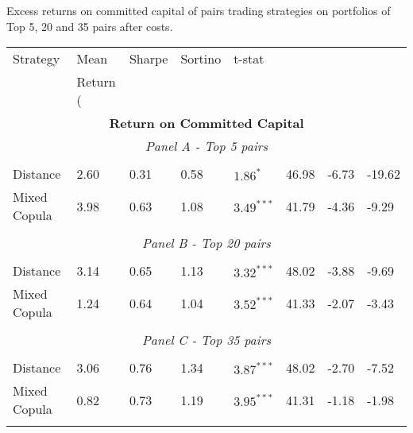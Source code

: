 \documentclass[a4paper]{article}
\begin{document}
	\begin{threeparttable}[H]
			\centering \tiny
			\caption{Excess returns on committed capital of pairs trading strategies on portfolios of Top 5, 20 and 35 pairs after costs. }
			\begin{tabularx}{\textwidth}{@{\extracolsep{\fill}}llllllll@{}}
				\toprule
				Strategy & Mean  & Sharpe & Sortino & t-stat & \\%
				& Return (\\%
				\midrule
				\multicolumn{8}{c}{\textbf{Return on Committed Capital}} \\
				\multicolumn{8}{c}{\textit{Panel A - Top 5 pairs}} \\
				&       &       &       &       &       &       &  \\
				Distance & 2.60  & 0.31  & 0.58  & $1.86^{*}$  & 46.98 & -6.73    & -19.62 \\
				Mixed Copula &  3.98  &  0.63  & 1.08  &  $3.49^{***}$  &  41.79 &  -4.36  &  -9.29 \\
				\multicolumn{1}{r}{} & \multicolumn{1}{r}{} & \multicolumn{1}{r}{} & \multicolumn{1}{r}{} & \multicolumn{1}{r}{} & \multicolumn{1}{r}{} & \multicolumn{1}{r}{} & \multicolumn{1}{r}{} \\
				\multicolumn{8}{c}{\textit{Panel B - Top 20 pairs}} \\
				&       &       &       &       &       &       &  \\
				Distance &  3.14  &  0.65  & 1.13  & $3.32^{***}$  & 48.02 & -3.88  & -9.69 \\
				Mixed Copula  & 1.24  & 0.64  & 1.04  & $3.52^{***}$  & 41.33 &  -2.07  &  -3.43  \\
				\multicolumn{1}{r}{} & \multicolumn{1}{r}{} & \multicolumn{1}{r}{} & \multicolumn{1}{r}{} & \multicolumn{1}{r}{} & \multicolumn{1}{r}{} & \multicolumn{1}{r}{} & \multicolumn{1}{r}{} \\
				\multicolumn{8}{c}{\textit{Panel C - Top 35 pairs}} \\
				&       &       &       &       &       &       &  \\
				Distance &  3.06  &  0.76  & 1.34  & $3.87^{***}$  & 48.02 & -2.70  & -7.52 \\
				Mixed Copula & 0.82  & 0.73  & 1.19  & $3.95^{***}$  & 41.31 &  -1.18  &  -1.98  \\
				\multicolumn{1}{r}{} & \multicolumn{1}{r}{} & \multicolumn{1}{r}{} & \multicolumn{1}{r}{} & \multicolumn{1}{r}{} & \multicolumn{1}{r}{} & \multicolumn{1}{r}{} & \multicolumn{1}{r}{} \\

\end{tabularx}
\end{threeparttable}
\end{document}
